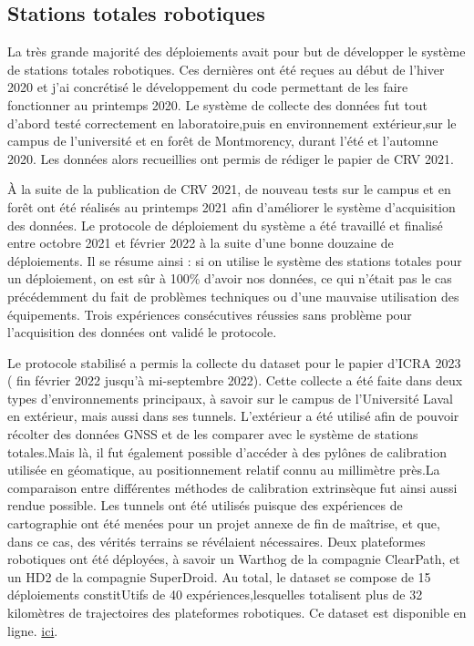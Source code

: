 \subsection{Stations totales robotiques}

La très grande majorité des déploiements avait pour but de  développer le système de stations totales robotiques.
Ces dernières ont été reçues au début de l'hiver 2020 et j'ai concrétisé le développement du code permettant de les faire fonctionner au printemps 2020.
Le système de collecte des données fut tout d'abord testé correctement en laboratoire,puis en environnement extérieur,sur le campus de l'université et en forêt de Montmorency, durant l'été et l'automne 2020.
Les données alors recueillies ont permis de rédiger le papier de CRV 2021.

À la suite de la publication de CRV 2021, de nouveau tests sur le campus et en forêt ont été réalisés au printemps 2021 afin d'améliorer le système d'acquisition des données. 
Le protocole de déploiement du système a été travaillé et finalisé entre octobre 2021 et février 2022 à la suite d'une bonne douzaine de déploiements.
Il se résume ainsi : si on utilise le système des stations totales pour un déploiement, on est sûr à 100\% d'avoir nos données, ce qui n'était pas le cas précédemment du fait de problèmes techniques ou d'une mauvaise utilisation des équipements.
 Trois expériences consécutives réussies sans problème pour l'acquisition des données ont validé le protocole.

 Le protocole stabilisé a permis la collecte du dataset pour le papier d'ICRA 2023 ( fin février 2022 jusqu'à mi-septembre 2022).
Cette collecte a été faite dans deux types d'environnements principaux, à savoir sur le campus de l'Université Laval en extérieur, mais aussi dans ses tunnels.
L'extérieur a été utilisé afin de pouvoir récolter des données \ac{GNSS} et de les comparer avec le système de stations totales.Mais là, il fut également possible d'accéder à des pylônes de calibration utilisée en géomatique, au positionnement relatif connu au millimètre près.La comparaison entre différentes méthodes de calibration extrinsèque fut ainsi aussi rendue possible.
Les tunnels ont été utilisés puisque des expériences de cartographie ont été menées pour un projet annexe de fin de maîtrise, et que, dans ce cas, des vérités terrains se révélaient nécessaires.
Deux plateformes robotiques ont été déployées, à savoir un Warthog de la compagnie ClearPath, et un HD2 de la compagnie SuperDroid.
Au total, le dataset se compose de 15 déploiements constitUtifs de 40 expériences,lesquelles totalisent plus de 32 kilomètres de trajectoires des plateformes robotiques.
Ce dataset est disponible en ligne. \href{https://github.com/norlab-ulaval/RTS_Extrinsic_Calibration/wiki/RTS-2022-Dataset}{ici}.

